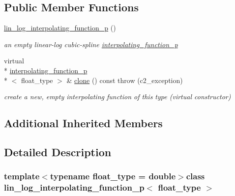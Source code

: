 \subsection*{Public Member Functions}
\begin{DoxyCompactItemize}
\item 
\hypertarget{classlin__log__interpolating__function__p_a461b4f4480a10a47e315dec7ff47bb4a}{\hyperlink{classlin__log__interpolating__function__p_a461b4f4480a10a47e315dec7ff47bb4a}{lin\-\_\-log\-\_\-interpolating\-\_\-function\-\_\-p} ()}\label{classlin__log__interpolating__function__p_a461b4f4480a10a47e315dec7ff47bb4a}

\begin{DoxyCompactList}\small\item\em an empty linear-\/log cubic-\/spline \hyperlink{classinterpolating__function__p}{interpolating\-\_\-function\-\_\-p} \end{DoxyCompactList}\item 
\hypertarget{classlin__log__interpolating__function__p_aaedeb95125e4f77a5ff00e1124ac53ab}{virtual \\*
\hyperlink{classinterpolating__function__p}{interpolating\-\_\-function\-\_\-p}\\*
$<$ float\-\_\-type $>$ \& \hyperlink{classlin__log__interpolating__function__p_aaedeb95125e4f77a5ff00e1124ac53ab}{clone} () const   throw (c2\-\_\-exception)}\label{classlin__log__interpolating__function__p_aaedeb95125e4f77a5ff00e1124ac53ab}

\begin{DoxyCompactList}\small\item\em create a new, empty interpolating function of this type (virtual constructor) \end{DoxyCompactList}\end{DoxyCompactItemize}
\subsection*{Additional Inherited Members}


\subsection{Detailed Description}
\subsubsection*{template$<$typename float\-\_\-type = double$>$class lin\-\_\-log\-\_\-interpolating\-\_\-function\-\_\-p$<$ float\-\_\-type $>$}

